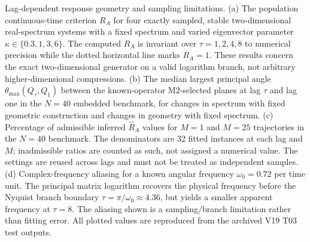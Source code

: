 \caption{Lag-dependent response geometry and sampling limitations. (a) The population continuous-time criterion $R_A$ for four exactly sampled, stable two-dimensional real-spectrum systems with a fixed spectrum and varied eigenvector parameter $\kappa\in\{0.3,1,3,6\}$. The computed $R_A$ is invariant over $\tau=1,2,4,8$ to numerical precision while the dotted horizontal line marks $R_A=1$. These results concern the exact two-dimensional generator on a valid logarithm branch, not arbitrary higher-dimensional compressions. (b) The median largest principal angle $\theta_{\max}(Q_\tau,Q_1)$ between the known-operator M2-selected planes at lag $\tau$ and lag one in the $N=40$ embedded benchmark, for changes in spectrum with fixed geometric construction and changes in geometry with fixed spectrum. (c) Percentage of admissible inferred $\widehat R_A$ values for $M=1$ and $M=25$ trajectories in the $N=40$ benchmark. The denominators are 32 fitted instances at each lag and $M$; inadmissible ratios are counted as such, not assigned a numerical value. The settings are reused across lags and must not be treated as independent samples. (d) Complex-frequency aliasing for a known angular frequency $\omega_0=0.72$ per time unit. The principal matrix logarithm recovers the physical frequency before the Nyquist branch boundary $\tau=\pi/\omega_0\approx4.36$, but yields a smaller apparent frequency at $\tau=8$. The aliasing shown is a sampling/branch limitation rather than fitting error. All plotted values are reproduced from the archived V19 T03 test outputs.}
